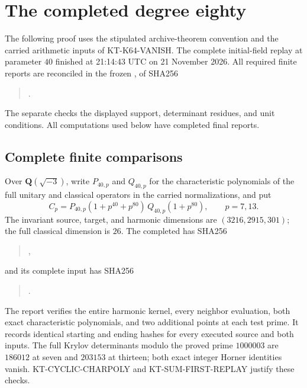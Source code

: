 \section{The completed degree eighty}
\label{sec:kt-further-e40}

The following proof uses the stipulated archive-theorem convention
and the carried arithmetic inputs of KT-K64-VANISH.
The complete initial-field replay at parameter $40$ finished at
21:14:43 UTC on 21 November 2026.  All required finite reports
are reconciled in the frozen
, of SHA256
\begin{quote}\small
{}.
\end{quote}
The separate  checks the
displayed support, determinant residues, and unit conditions.
All computations used below have completed final reports.

\subsection{Complete finite comparisons}

Over $\mathbf Q(\sqrt{-3})$, write $P_{40,p}$ and $Q_{40,p}$ for
the characteristic polynomials of the full unitary and classical
operators in the carried normalizations, and put
\[
 C_p=P_{40,p}(1+p^{40}+p^{80})\,Q_{40,p}(1+p^{80}),
                     \qquad p=7,13.                      \tag{KF40.1}
\]
The invariant source, target, and harmonic dimensions are
$(3216,2915,301)$; the full classical dimension is $26$.
The completed 
has SHA256
\begin{quote}\small
{},
\end{quote}
and its complete input has SHA256
\begin{quote}\small
{}.
\end{quote}
The report verifies the entire harmonic kernel, every neighbor
evaluation, both exact characteristic polynomials, and two
additional points at each test prime.  It records identical
starting and ending hashes for every executed source and both
inputs.  The full Krylov determinants modulo the proved prime
$1000003$ are $186012$ at seven and $203153$ at thirteen;
both exact integer Horner identities vanish.
KT-CYCLIC-CHARPOLY and KT-SUM-FIRST-REPLAY justify these checks.

